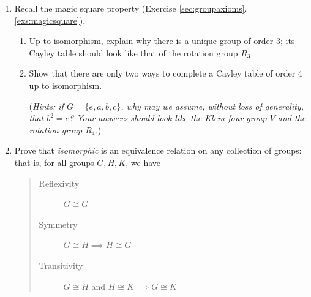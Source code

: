 \begin{exercises}{}
\begin{enumerate}

	\item Recall the magic square property (Exercise \ref*{sec:groupaxioms}.\ref{exs:magicsquare}).
	\begin{enumerate}
	  \item Up to isomorphism, explain why there is a unique group of order 3; its Cayley table should look like that of the rotation group $R_3$.
	  
	  \item Show that there are only two ways to complete a Cayley table of order 4 up to isomorphism.\par
		(\emph{Hints: if $G=\{e,a,b,c\}$, why may we assume, without loss of generality, that $b^2=e$? Your answers should look like the Klein four-group $V$ and the rotation group $R_4$.})
	\end{enumerate}
		
	\item\label{exs:isomorphiccomposition} Prove that \emph{isomorphic} is an equivalence relation on any collection of groups: that is, for all groups $G,H,K$, we have
	\begin{quote}
	\begin{description}
	  \item[\normalfont Reflexivity] $G\cong G$
	  \item[\normalfont Symmetry] $G\cong H\implies H\cong G$
	  \item[\normalfont Transitivity] $G\cong H$ and $H\cong K\implies G\cong K$
	\end{description}
	\end{quote}
	
\end{enumerate}
\end{exercises}


